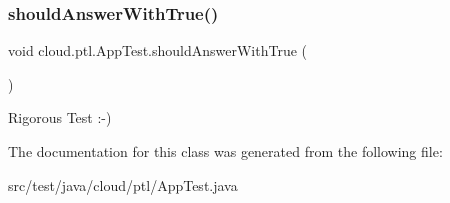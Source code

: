 \subsubsection{\texorpdfstring{should\+Answer\+With\+True()}{shouldAnswerWithTrue()}}
{\footnotesize\ttfamily void cloud.\+ptl.\+App\+Test.\+should\+Answer\+With\+True (\begin{DoxyParamCaption}{ }\end{DoxyParamCaption})\hspace{0.3cm}{\ttfamily [inline]}}

Rigorous Test \+:-\/) 

The documentation for this class was generated from the following file\+:\begin{DoxyCompactItemize}
\item 
src/test/java/cloud/ptl/App\+Test.\+java\end{DoxyCompactItemize}
